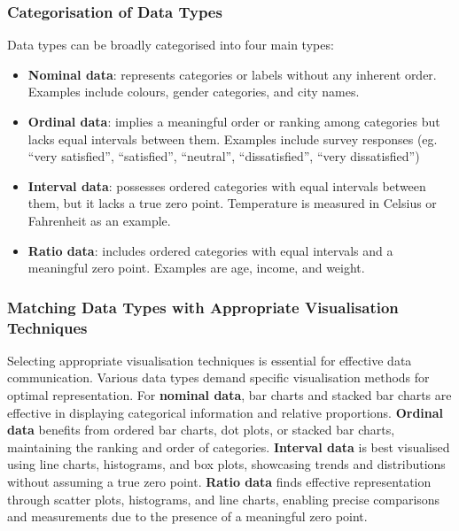 \documentclass{article}\usepackage[]{graphicx}\usepackage[]{xcolor}
\begin{document}
\subsubsection{Categorisation of Data Types}
Data types can be broadly categorised into four main types: 
\begin{itemize}
    \item \textbf{Nominal data}: represents categories or labels without any inherent order. Examples include colours, gender categories, and city names. 
    \item \textbf{Ordinal data}: implies a meaningful order or ranking among categories but lacks equal intervals between them. Examples include survey responses (eg. “very satisfied”, “satisfied”, “neutral”, “dissatisfied”, “very dissatisfied”)
    \item \textbf{Interval data}: possesses ordered categories with equal intervals between them, but it lacks a true zero point. Temperature is measured in Celsius or Fahrenheit as an example. 
    \item \textbf{Ratio data}: includes ordered categories with equal intervals and a meaningful zero point. Examples are age, income, and weight. 
\end{itemize}

\subsubsection{Matching Data Types with Appropriate Visualisation Techniques}
Selecting appropriate visualisation techniques is essential for effective data communication. Various data types demand specific visualisation methods for optimal representation. For \textbf{nominal data}, bar charts and stacked bar charts are effective in displaying categorical information and relative proportions. \textbf{Ordinal data} benefits from ordered bar charts, dot plots, or stacked bar charts, maintaining the ranking and order of categories. \textbf{Interval data} is best visualised using line charts, histograms, and box plots, showcasing trends and distributions without assuming a true zero point. \textbf{Ratio data} finds effective representation through scatter plots, histograms, and line charts, enabling precise comparisons and measurements due to the presence of a meaningful zero point.
\end{document}
